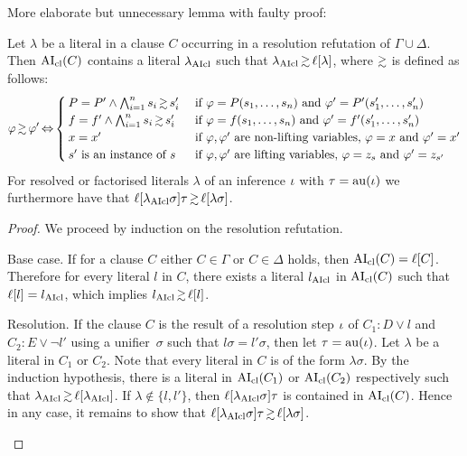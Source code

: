\documentclass[,%
	draft=false,%
	numbers=noendperiod
	11pt,
	a4paper,
	oneside,%
	openany,
]{memoir}
\begin{document}
{ More elaborate but unnecessary lemma with faulty proof:

	\tiny


	\begin{lemma}
		\label{lemma:literals_clause_simgeq}
		Let $\lambda$ be a literal in a clause $C$ occurring in a resolution refutation of $\Gamma\cup\Delta$.
		Then $\operatorname{AI}_\mathrm{cl}(C)$ contains a literal $\lambda_{\operatorname{AIcl}}$ such that $\lambda\cl \simgeq \lifboth{\lambda}$, where $\simgeq$ is defined as follows:
		\[
			\varphi \simgeq \varphi' \semiff
			\begin{cases}
				P = P' \land \bigwedge_{i=1}^n s_i \simgeq s'_i &  \text{ if $\varphi = P(s_1, \dots, s_n)$ and $\varphi' = P'(s'_1, \dots, s'_n)$} \\
				f = f' \land \bigwedge_{i=1}^n s_i \simgeq s'_i &  \text{ if $\varphi = f(s_1, \dots, s_n)$ and $\varphi' = f'(s'_1, \dots, s'_n)$} \\
				x = x' & \text{ if $\varphi, \varphi'$ are non-lifting variables, $\varphi = x$ and $\varphi' = x'$} \\
				s' \text{ is an instance of } s  & \text{ if $\varphi, \varphi'$ are lifting variables, $\varphi = z_s$ and $\varphi' = z_{s'}$} \\
			\end{cases}
		\]
		For resolved or factorised literals $\lambda$ of an inference $\iota$ with $\tau = \operatorname{au}(\iota)$ we furthermore have that $\lifboth{\lambda\cl\sigma}\tau \simgeq \lifboth{\lambda\sigma}$.
	\end{lemma}
	\begin{proof}
		We proceed by induction on the resolution refutation.
		\begin{description}
			\item{Base case.}
				If for a clause $C$ either $C\in \Gamma$ or $C \in \Delta$ holds, then $\operatorname{AI}_\mathrm{cl}(C) = \ell[C]$.
				Therefore for every literal $l$ in $C$, there exists a literal $l_{\operatorname{AIcl}}$ in $\operatorname{AI}_\mathrm{cl}(C)$ such that $\ell[l] = l_{\operatorname{AIcl}}$, which implies $l\cl \simgeq \lifboth{l}$.

			\item{Resolution.}
				If the clause $C$ is the result of a resolution step $\iota$ of $C_1: D \lor l$ and $C_2: E \lor \lnot l'$ using a unifier~$\sigma$ such that $l\sigma = l'\sigma$,
				then let $\tau = \operatorname{au}(\iota)$.
				Let $\lambda$ be a literal in $C_1$ or $C_2$.
				Note that every literal in $C$ is of the form $\lambda\sigma$.
				By the induction hypothesis, there is a literal in $\operatorname{AI}_\mathrm{cl}(C_1)$ or $\operatorname{AI}_\mathrm{cl}(C_2)$ respectively such that $\lambda\cl \simgeq \lifboth{\lambda\cl}$.
				If $\lambda \not\in\{l,l'\}$, then $\ell[\lambda_{\operatorname{AIcl}}\sigma]\tau$ is contained in $\operatorname{AI}_\mathrm{cl}(C)$.
				Hence in any case, it remains to show that $\lifboth{\lambda\cl\sigma}\tau \simgeq \lifboth{\lambda\sigma}$.



\end{description}
\end{proof}}
\end{document}
